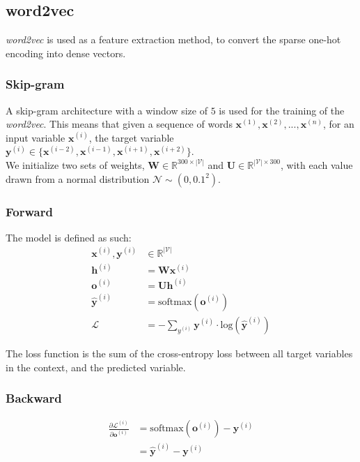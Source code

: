 \documentclass{article}
\numberwithin{equation}{section}
\begin{document}
\subsection{word2vec}
\emph{word2vec} is used as a feature extraction method, to convert the sparse one-hot encoding into dense vectors.

\subsubsection{Skip-gram}
A skip-gram architecture with a window size of $5$ is used for the training of the \emph{word2vec}. This means that given a sequence of words $\bm{x}^{(1)}, \bm{x}^{(2)}, ..., \bm{x}^{(n)}$, for an input variable $\bm{x}^{(i)}$, the target variable $\bm{y}^{(i)} \in \{\bm{x}^{(i-2)}, \bm{x}^{(i-1)}, \bm{x}^{(i+1)}, \bm{x}^{(i+2)}\}$.\\

We initialize two sets of weights, $\bm{W} \in \mathbb{R}^{300 \times |\mathcal{V}|}$ and $\bm{U} \in \mathbb{R}^{|\mathcal{V}| \times 300}$, with each value drawn from a normal distribution $\mathcal{N} \sim (0, 0.1^2)$.\\

\subsubsection{Forward}
The model is defined as such:
\begin{equation}
\begin{split}
	\bm{x}^{(i)}, \bm{y}^{(i)} &\in \mathbb{R}^{|\mathcal{V}|} \\
	\bm{h}^{(i)} &= \bm{W} \bm{x}^{(i)} \\
	\bm{o}^{(i)} &= \bm{U} \bm{h}^{(i)} \\
 	\hat{\bm{y}}^{(i)} &= \text{softmax}(\bm{o}^{(i)}) \\
	\mathcal{L} &= -\sum_{y^{(i)}} \bm{y}^{(i)} \cdot \text{log}(\hat{\bm{y}}^{(i)})
\end{split}
\end{equation}

The loss function is the sum of the cross-entropy loss between all target variables in the context, and the predicted variable.

\subsubsection{Backward}
\begin{equation}
\begin{split}
\frac{\partial \mathcal{L}^{(i)}}{\partial \bm{o}^{(i)}}
	&= \text{softmax}(\bm{o}^{(i)}) - \bm{y}^{(i)} \\
	&= \hat{\bm{y}}^{(i)} - \bm{y}^{(i)}
\end{split}
\end{equation}
\end{document}
